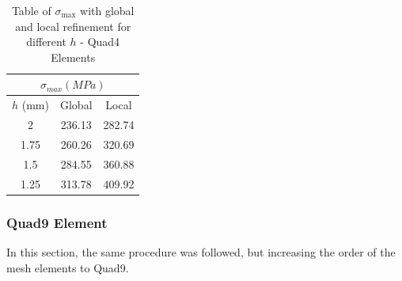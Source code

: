 \begin{table}[H]
  \centering
\caption{Table of $\sigma_{\max}$ with global and local refinement for different $h$ - Quad4 Elements}
  \begin{tabular}{|c|c|c|}
    \hline
    \multicolumn{3}{|c|}{$\sigma_{max} (MPa)$} \\ \hline
    $h$ (mm) & Global & Local \\ \hline
    2 & 236.13 & 282.74 \\ \hline
    1.75 & 260.26 & 320.69 \\ \hline
    1.5 & 284.55 & 360.88 \\ \hline
    1.25 & 313.78 & 409.92 \\ \hline
  \end{tabular}
  \label{tab:5x2}
\end{table}

\subsubsection{Quad9 Element}

In this section, the same procedure was followed, but increasing the order of the mesh elements to Quad9.

